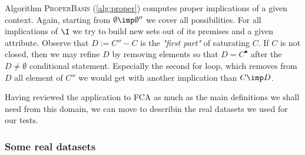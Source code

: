 \vspace{1.2em}

Algorithm \textsc{ProperBasis} (\ref{alg:proper}) computes proper implications of a given context. Again, starting from $\emptyset \imp \emptyset''$ we cover all possibilities. For all implications of $\I$ we try to build new sets out of
its premises and a given attribute. Observe that $D := C'' - C$ is the \textit{"first part"} of saturating $C$. If $C$ is not closed, then we may refine $D$ by removing elements so that $D = C^{\bullet}$ after the $D \neq \emptyset$ conditional statement. Especially the second for loop, which removes
from $D$ all element of $C''$ we would get with another implication than $C \imp D$.

\vspace{1.2em}

Having reviewed the application to FCA as much as the main definitions we shall need from this domain, we can move to describin the real datasets we used for our tests.




\subsubsection{Some real datasets}

